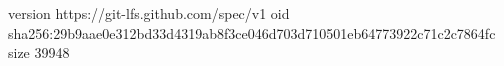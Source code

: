 version https://git-lfs.github.com/spec/v1
oid sha256:29b9aae0e312bd33d4319ab8f3ce046d703d710501eb64773922c71c2c7864fc
size 39948
